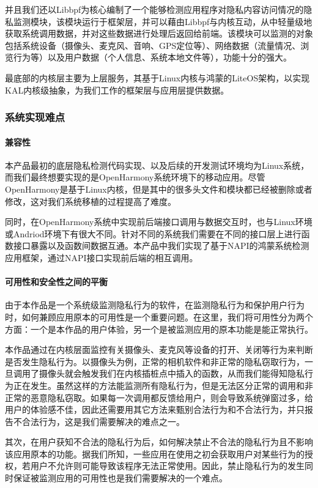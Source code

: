 \documentclass[12pt,a4paper]{ctexart}
\begin{document}
并且我们还以Libbpf为核心编制了一个能够检测应用程序对隐私内容访问情况的隐私监测模块，该模块运行于框架层，并可以藉由Libbpf与内核互动，从中轻量级地获取系统调用数据，并对这些数据进行处理后返回给前端。该模块可以监测的对象包括系统设备（摄像头、麦克风、音响、GPS定位等）、网络数据（流量情况、浏览行为等）以及用户数据（个人信息、系统本地文件等），功能十分的强大。


最底部的内核层主要为上层服务，其基于Linux内核与鸿蒙的LiteOS架构，以实现KAL内核级抽象，为我们工作的框架层与应用层提供数据。

\subsubsection{系统实现难点}
\paragraph{兼容性}
本产品最初的底层隐私检测代码实现、以及后续的开发测试环境均为Linux系统，而我们最终想要实现的是OpenHarmony系统环境下的移动应用。尽管OpenHarmony是基于Linux内核，但是其中的很多头文件和模块都已经被删除或者修改，这对我们系统移植的过程提高了难度。


同时，在OpenHarmony系统中实现前后端接口调用与数据交互时，也与Linux环境或Andriod环境下有很大不同。针对不同的系统我们需要在不同的接口层上进行函数接口暴露以及函数间数据互通。本产品中我们实现了基于NAPI的鸿蒙系统检测应用框架，通过NAPI接口实现前后端的相互调用。

\paragraph{可用性和安全性之间的平衡}
由于本作品是一个系统级监测隐私行为的软件，在监测隐私行为和保护用户行为时，如何兼顾应用原本的可用性是一个重要问题。在这里，我们将可用性分为两个方面：一个是本作品的用户体验，另一个是被监测应用的原本功能是能正常执行。


本作品通过在内核层面监控有关摄像头、麦克风等设备的打开、关闭等行为来判断是否发生隐私行为。以摄像头为例，正常的相机软件和非正常的隐私窃取行为，一旦调用了摄像头就会触发我们在内核插桩点中插入的函数，从而我们能得知隐私行为正在发生。虽然这样的方法能监测所有隐私行为，但是无法区分正常的调用和非正常的恶意隐私窃取。如果每一次调用都反馈给用户，则会导致系统弹窗过多，给用户的体验感不佳，因此还需要用其它方法来甄别合法行为和不合法行为，并只报告不合法行为，这是我们需要解决的难点之一。


其次，在用户获知不合法的隐私行为后，如何解决禁止不合法的隐私行为且不影响该应用原本的功能。据我们所知，一些应用在使用之初会获取用户对某些行为的授权，若用户不允许则可能导致该程序无法正常使用。因此，禁止隐私行为的发生同时保证被监测应用的可用性也是我们需要解决的一个难点。
\end{document}
